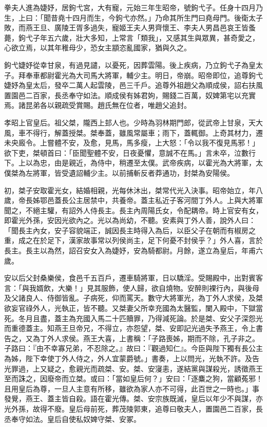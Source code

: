\begin{pinyinscope}
拳夫人進為婕妤，居鉤弋宮，大有寵，元始三年生昭帝，號鉤弋子。任身十四月乃生，上曰：「聞昔堯十四月而生，今鉤弋亦然。」乃命其所生門曰堯母門。後衛太子敗，而燕王旦、廣陵王胥多過失，寵姬王夫人男齊懷王、李夫人男昌邑哀王皆蚤薨，鉤弋子年五六歲，壯大多知，上常言「類我」，又感其生與眾異，甚奇愛之，心欲立焉，以其年稚母少，恐女主顓恣亂國家，猶與久之。

鉤弋婕妤從幸甘泉，有過見譴，以憂死，因葬雲陽。後上疾病，乃立鉤弋子為皇太子。拜奉車都尉霍光為大司馬大將軍，輔少主。明日，帝崩。昭帝即位，追尊鉤弋婕妤為皇太后，發卒二萬人起雲陵，邑三千戶。追尊外祖趙父為順成侯，詔右扶風置園邑二百家，長丞奉守如法。順成侯有姊君姁，賜錢二百萬，奴婢第宅以充實焉。諸昆弟各以親疏受賞賜。趙氏無在位者，唯趙父追封。

孝昭上官皇后。祖父桀，隴西上邽人也。少時為羽林期門郎，從武帝上甘泉，天大風，車不得行，解蓋授桀。桀奉蓋，雖風常屬車；雨下，蓋輒御。上奇其材力，遷未央廄令。上嘗體不安，及愈，見馬，馬多瘦，上大怒：「令以我不復見馬邪！」欲下吏，桀頓首曰：「臣聞聖體不安，日夜憂懼，意誠不在馬。」言未卒，泣數行下。上以為忠，由是親近，為侍中，稍遷至太僕。武帝疾病，以霍光為大將軍，太僕桀為左將軍，皆受遺詔輔少主。以前捕斬反者莽通功，封桀為安陽侯。

初，桀子安取霍光女，結婚相親，光每休沐出，桀常代光入決事。昭帝始立，年八歲，帝長姊鄂邑蓋長公主居禁中，共養帝。蓋主私近子客河間丁外人。上與大將軍聞之，不絕主驩，有詔外人侍長主。長主內周陽氏女，令配耦帝。時上官安有女，即霍光外孫，安因光欲內之。光以為尚幼，不聽。安素與丁外人善，說外人曰：「聞長主內女，安子容貌端正，誠因長主時得入為后，以臣父子在朝而有椒房之重，成之在於足下，漢家故事常以列侯尚主，足下何憂不封侯乎？」外人喜，言於長主。長主以為然，詔召安女入為婕妤，安為騎都尉。月餘，遂立為皇后，年甫六歲。

安以后父封桑樂侯，食邑千五百戶，遷車騎將軍，日以驕淫。受賜殿中，出對賓客言：「與我婿飲，大樂！」見其服飾，使人歸，欲自燒物。安醉則裸行內，與後母及父諸良人、侍御皆亂。子病死，仰而罵天。數守大將軍光，為丁外人求侯，及桀欲妄官祿外人，光執正，皆不聽。又桀妻父所幸充國為太醫監，闌入殿中，下獄當死。冬月且盡，蓋主為充國入馬二十匹贖罪，乃得減死論。於是桀、安父子深怨光而重德蓋主。知燕王旦帝兄，不得立，亦怨望，桀、安即記光過失予燕王，令上書告之，又為丁外人求侯。燕王大喜，上書稱：「子路喪姊，期而不除，孔子非之。子路曰：『由不幸寡兄弟，不忍除之。』故曰：『觀過知仁』。今臣與陛下獨有長公主為姊，陛下幸使丁外人侍之，外人宜蒙爵號。」書奏，上以問光，光執不許。及告光罪過，上又疑之，愈親光而疏桀、安。桀、安寖恚，遂結黨與謀殺光，誘徵燕王至而誅之，因廢帝而立桀。或曰：「當如皇后何？」安曰：「逐麋之狗，當顧菟邪！且用皇后為尊，一旦人主意有所移，雖欲為家人亦不可得，此百世之一時也。」事發覺，燕王、蓋主皆自殺。語在霍光傳。桀、安宗族既滅，皇后以年少不與謀，亦光外孫，故得不廢。皇后母前死，葬茂陵郭東，追尊曰敬夫人，置園邑二百家，長丞奉守如法。皇后自使私奴婢守桀、安冢。


\end{pinyinscope}
